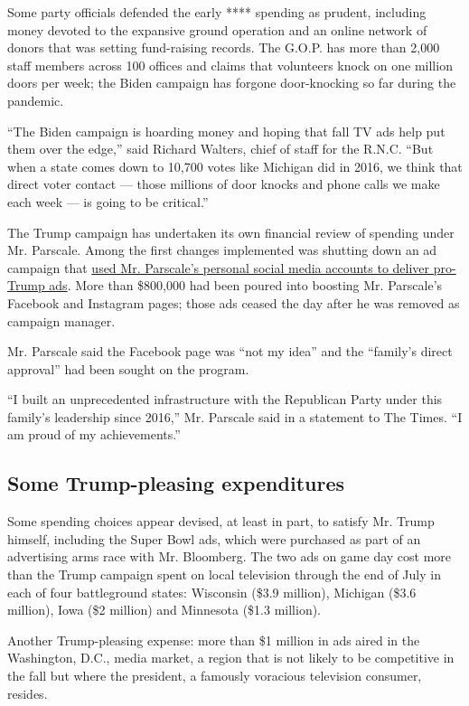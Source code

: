 Some party officials defended the early **** spending as prudent,
including money devoted to the expansive ground operation and an online
network of donors that was setting fund-raising records. The G.O.P. has
more than 2,000 staff members across 100 offices and claims that
volunteers knock on one million doors per week; the Biden campaign has
forgone door-knocking so far during the pandemic.

``The Biden campaign is hoarding money and hoping that fall TV ads help
put them over the edge,'' said Richard Walters, chief of staff for the
R.N.C. ``But when a state comes down to 10,700 votes like Michigan did
in 2016, we think that direct voter contact --- those millions of door
knocks and phone calls we make each week --- is going to be critical.''

The Trump campaign has undertaken its own financial review of spending
under Mr. Parscale. Among the first changes implemented was shutting
down an ad campaign that
\href{https://www.nytimes3xbfgragh.onion/2020/06/30/us/politics/brad-parscale-trump.html}{used
Mr. Parscale's personal social media accounts to deliver pro-Trump ads}.
More than \$800,000 had been poured into boosting Mr. Parscale's
Facebook and Instagram pages; those ads ceased the day after he was
removed as campaign manager.

Mr. Parscale said the Facebook page was ``not my idea'' and the
``family's direct approval'' had been sought on the program.

``I built an unprecedented infrastructure with the Republican Party
under this family's leadership since 2016,'' Mr. Parscale said in a
statement to The Times. ``I am proud of my achievements.''

\hypertarget{some-trump-pleasing-expenditures}{%
\subsection{Some Trump-pleasing
expenditures}\label{some-trump-pleasing-expenditures}}

Some spending choices appear devised, at least in part, to satisfy Mr.
Trump himself, including the Super Bowl ads, which were purchased as
part of an advertising arms race with Mr. Bloomberg. The two ads on game
day cost more than the Trump campaign spent on local television through
the end of July in each of four battleground states: Wisconsin (\$3.9
million), Michigan (\$3.6 million), Iowa (\$2 million) and Minnesota
(\$1.3 million).

Another Trump-pleasing expense: more than \$1 million in ads aired in
the Washington, D.C., media market, a region that is not likely to be
competitive in the fall but where the president, a famously voracious
television consumer, resides.

